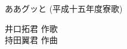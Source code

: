 ﻿\documentclass[10pt,a5j]{tarticle} %
\begin{document}
\thispagestyle{empty} %
\newcommand{\linespace}{0.8em} %
\newcommand{\blocksize}{0.33\hsize} %

\begin{minipage}[c]{0.5\hsize}
	\begin{center}
		{\LARGE
			ああグッと
		}
		{\small 
			(平成十五年度寮歌)
		}\\
	\end{center}
\end{minipage}
\begin{minipage}[c]{0.5\hsize}
	\begin{flushright}%
		井口拓君 作歌\\
		持田翼君 作曲
	\end{flushright}
\end{minipage}

\vspace{1.5em}
\end{document}
